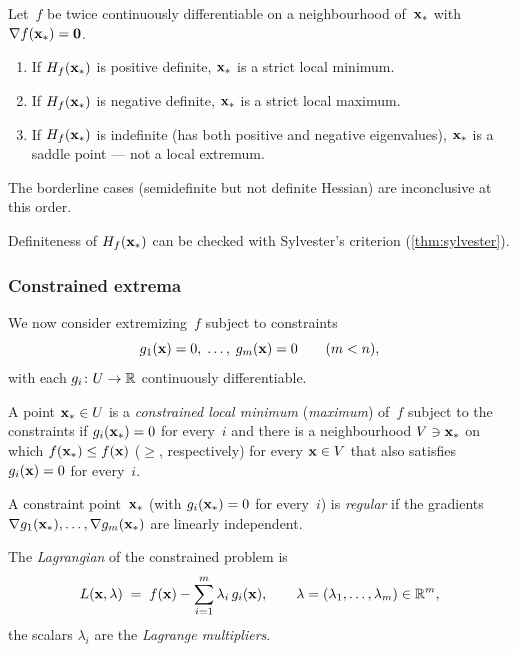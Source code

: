 \begin{theorem}
\label{thm:sufficient-uncon}
Let~$f$ be twice continuously differentiable on a neighbourhood
of~$\mathbf{x}_*$ with $\nabla f(\mathbf{x}_*) = \mathbf{0}$.
\begin{enumerate}[label=(\alph*)]
  \item If $H_f(\mathbf{x}_*)$ is positive definite, $\mathbf{x}_*$ is a
        strict local minimum.
  \item If $H_f(\mathbf{x}_*)$ is negative definite, $\mathbf{x}_*$ is a
        strict local maximum.
  \item If $H_f(\mathbf{x}_*)$ is indefinite (has both positive and
        negative eigenvalues), $\mathbf{x}_*$ is a saddle point — not
        a local extremum.
\end{enumerate}
The borderline cases (semidefinite but not definite Hessian) are
inconclusive at this order.
\end{theorem}

Definiteness of $H_f(\mathbf{x}_*)$ can be checked with Sylvester's
criterion (\cref{thm:sylvester}).

\subsubsection*{Constrained extrema}

We now consider extremizing~$f$ subject to constraints
\[
  g_1(\mathbf{x}) = 0, \;\dots, \; g_m(\mathbf{x}) = 0 \qquad (m < n),
\]
with each $g_i \colon U \to \mathbb{R}$ continuously differentiable.

\begin{definition}
\label{def:constrained-extremum}
A point $\mathbf{x}_* \in U$ is a \emph{constrained local minimum}
(\emph{maximum}) of~$f$ subject to the constraints if
$g_i(\mathbf{x}_*) = 0$ for every~$i$ and there is a neighbourhood
$V \ni \mathbf{x}_*$ on which $f(\mathbf{x}_*) \le f(\mathbf{x})$
($\ge$, respectively) for every $\mathbf{x} \in V$ that also satisfies
$g_i(\mathbf{x}) = 0$ for every~$i$.
\end{definition}

\begin{definition}
\label{def:regularity}
A constraint point~$\mathbf{x}_*$ (with $g_i(\mathbf{x}_*) = 0$ for
every~$i$) is \emph{regular} if the gradients
$\nabla g_1(\mathbf{x}_*), \dots, \nabla g_m(\mathbf{x}_*)$ are linearly
independent.
\end{definition}

\begin{definition}
\label{def:lagrangian}
The \emph{Lagrangian} of the constrained problem is
\[
  L(\mathbf{x}, \mathbf{\lambda}) \;=\; f(\mathbf{x}) - \sum_{i=1}^{m} \lambda_i\, g_i(\mathbf{x}),
  \qquad \mathbf{\lambda} = (\lambda_1, \dots, \lambda_m) \in \mathbb{R}^m,
\]
the scalars $\lambda_i$ are the \emph{Lagrange multipliers}.
\end{definition}

